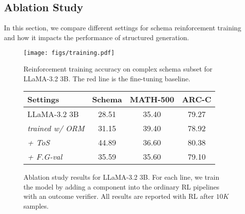 


\subsection{Ablation Study}
In this section, we compare different settings for schema reinforcement training and how it impacts the performance of structured generation.

\begin{figure}
\begin{minipage}[]{0.48\linewidth}
\centering
\texttt{[image: figs/training.pdf]}
\caption{Reinforcement training accuracy on complex schema subset for LLaMA-3.2 3B. The red line is the fine-tuning baseline.}
\label{fig:rl_training}
\end{minipage}
\noindent
\hfill
\begin{minipage}[]{0.48\linewidth}
\centering
\begin{tabular}{lccc}
\toprule
\textbf{Settings} & \textbf{Schema} & \textbf{MATH-500} & \textbf{ARC-C}\\
\midrule
LLaMA-3.2 3B & 28.51 & 35.40 & 79.27  \\ 
\textit{trained w/ ORM} & 31.15 & 39.40 & 78.92 \\
\textit{+ ToS} & 44.89 & 36.60 & 80.38 \\ 
\textit{+ F.G-val} & 35.59 & 35.60 & 79.10 \\ 
\bottomrule
\end{tabular}
\caption{Ablation study results for LLaMA-3.2 3B.
For each line, we train the model by adding a component into the ordinary RL pipelines with an outcome verifier. All results are reported with RL after $10K$ samples.}
\label{tab:ablation}
\end{minipage}
\end{figure}




